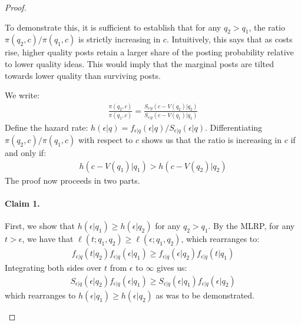 \begin{proof}
\begin{enumerate}[label=(\roman*)]
To demonstrate this, it is sufficient to establish that for any $q_2 > q_1$, the ratio $\pi(q_2,c)/\pi(q_1,c)$ is strictly increasing in $c$. Intuitively, this says that as costs rise, higher quality posts retain a larger share of the posting probability relative to lower quality ideas. This would imply that the marginal posts are tilted towards lower quality than surviving posts.

We write:
\begin{align*}
\frac{\pi(q_2,c)}{\pi(q_1,c)} = \frac{S_{\epsilon|q}(c-V(q_2)|q_2)}{S_{\epsilon|q}(c-V(q_1)|q_1)} \label{eq_prob_ratio}
\end{align*}
Define the hazard rate: $h(\epsilon|q) = f_{\epsilon|q}(\epsilon|q) / S_{\epsilon|q}(\epsilon|q)$. Differentiating $\pi(q_2,c)/\pi(q_1,c)$ with respect to $c$ shows us that the ratio is increasing in $c$ if and only if:
\begin{align*}
h(c - V(q_1) | q_1) > h(c - V(q_2) | q_2)
\end{align*}
The proof now proceeds in two parts. 

\paragraph{Claim 1.} First, we show that $h(\epsilon | q_1) \geq h(\epsilon | q_2)$ for any $q_2 > q_1$. By the MLRP, for any $t > \epsilon$, we have that $\ell(t; q_1, q_2) \geq \ell(\epsilon; q_1, q_2)$, which rearranges to:
\begin{align*}
f_{\epsilon|q}(t|q_2) f_{\epsilon|q}(\epsilon|q_1) \geq f_{\epsilon|q}(\epsilon|q_2) f_{\epsilon|q}(t|q_1)
\end{align*}
Integrating both sides over $t$ from $\epsilon$ to $\infty$ gives us:
\begin{align*}
S_{\epsilon|q}(\epsilon|q_2) f_{\epsilon|q}(\epsilon|q_1) \geq S_{\epsilon|q}(\epsilon|q_1) f_{\epsilon|q}(\epsilon|q_2)
\end{align*}
which rearranges to $h(\epsilon|q_1) \geq h(\epsilon | q_2)$ as was to be demonstrated.


\end{enumerate}
\end{proof}
